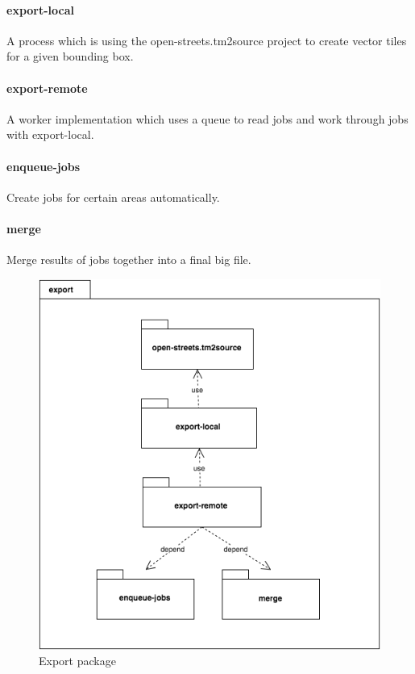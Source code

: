 \paragraph{export-local}
A process which is using the open-streets.tm2source project to create vector tiles for a
given bounding box.

\paragraph{export-remote}
A worker implementation which uses a queue to read jobs and work through jobs with
export-local.

\paragraph{enqueue-jobs}
Create jobs for certain areas automatically.

\paragraph{merge}
Merge results of jobs together into a final big file.

\begin{figure}[h]
  \includegraphics[scale=0.6]{images/export_package.png}
  \caption{Export package}
\end{figure}
\newpage